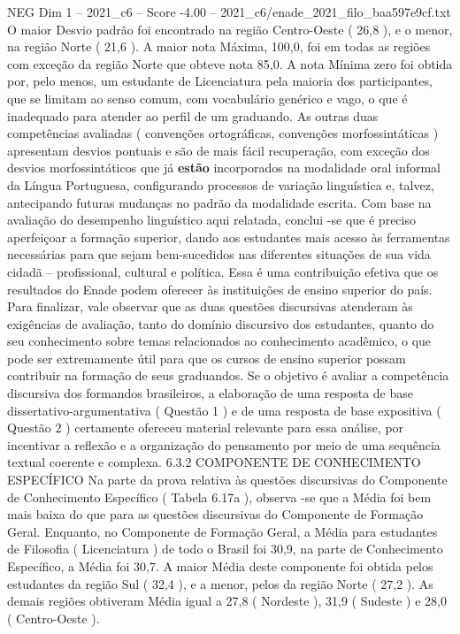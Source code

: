 \begin{textsample}{NEG Dim 1 – 2021\_c6 – Score -4.00 – 2021\_c6/enade\_2021\_filo\_baa597e9cf.txt}
O maior Desvio padrão foi encontrado na região Centro-Oeste ( 26,8 ), e o menor, na região Norte ( 21,6 ).
A maior nota Máxima, 100,0, foi em todas as regiões com exceção da região Norte que obteve nota 85,0.
A nota Mínima zero foi obtida por, pelo menos, um estudante de Licenciatura pela maioria dos participantes, que se limitam ao senso comum, com vocabulário genérico e vago, o que é inadequado para atender ao perfil de um graduando.
As outras duas competências avaliadas ( convenções ortográficas, convenções morfossintáticas ) apresentam desvios pontuais e são de mais fácil recuperação, com exceção dos desvios morfossintáticos que já \textbf{estão} incorporados na modalidade oral informal da Língua Portuguesa, configurando processos de variação linguística e, talvez, antecipando futuras mudanças no padrão da modalidade escrita.
Com base na avaliação do desempenho linguístico aqui relatada, conclui -se que é preciso aperfeiçoar a formação superior, dando aos estudantes mais acesso às ferramentas necessárias para que sejam bem-sucedidos nas diferentes situações de sua vida cidadã – profissional, cultural e política.
Essa é uma contribuição efetiva que os resultados do Enade podem oferecer às instituições de ensino superior do país.
Para finalizar, vale observar que as duas questões discursivas atenderam às exigências de avaliação, tanto do domínio discursivo dos estudantes, quanto do seu conhecimento sobre temas relacionados ao conhecimento acadêmico, o que pode ser extremamente útil para que os cursos de ensino superior possam contribuir na formação de seus graduandos.
Se o objetivo é avaliar a competência discursiva dos formandos brasileiros, a elaboração de uma resposta de base dissertativo-argumentativa ( Questão 1 ) e de uma resposta de base expositiva ( Questão 2 ) certamente ofereceu material relevante para essa análise, por incentivar a reflexão e a organização do pensamento por meio de uma sequência textual coerente e complexa. 6.3.2 COMPONENTE DE CONHECIMENTO ESPECÍFICO Na parte da prova relativa às questões discursivas do Componente de Conhecimento Específico ( Tabela 6.17a ), observa -se que a Média foi bem mais baixa do que para as questões discursivas do Componente de Formação Geral.
Enquanto, no Componente de Formação Geral, a Média para estudantes de Filosofia ( Licenciatura ) de todo o Brasil foi 30,9, na parte de Conhecimento Específico, a Média foi 30,7.
A maior Média deste componente foi obtida pelos estudantes da região Sul ( 32,4 ), e a menor, pelos da região Norte ( 27,2 ).
As demais regiões obtiveram Média igual a 27,8 ( Nordeste ), 31,9 ( Sudeste ) e 28,0 ( Centro-Oeste ).

\end{textsample}
